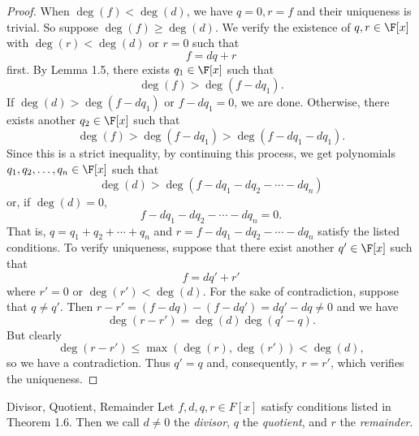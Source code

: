 \documentclass[linearalgebraII]{subfiles}
\begin{document}
    \begin{proof}
        When $\deg(f) < \deg(d)$, we have $q=0, r=f$ and their uniqueness is trivial. So suppose $\deg(f)\geq\deg(d)$. We verify the existence of $q, r\in \F[x]$ with $\deg(r)<\deg(d)$ or $r=0$ such that
        \begin{equation*}
            f = dq+r
        \end{equation*}
        first. By Lemma 1.5, there exists $q_1\in \F[x]$ such that
        \begin{equation*}
            \deg(f) > \deg(f-dq_1).
        \end{equation*}
        If $\deg(d) > \deg(f-dq_1)$ or $f-dq_1 = 0$, we are done. Otherwise, there exists another $q_2\in \F[x]$ such that
        \begin{equation*}
            \deg(f) > \deg(f-dq_1) > \deg(f-dq_1-dq_1).
        \end{equation*}
        Since this is a strict inequality, by continuing this process, we get polynomials $q_1, q_2, \ldots, q_n\in \F[x]$ such that
        \begin{equation*}
            \deg(d) > \deg(f-dq_1-dq_2-\cdots-dq_n)
        \end{equation*}
        or, if $\deg(d) = 0$,
        \begin{equation*}
            f - dq_1 - dq_2 - \cdots - dq_n = 0.
        \end{equation*}
        That is, $q = q_1+q_2+\cdots+q_n$ and $r = f-dq_1-dq_2-\cdots-dq_n$ satisfy the listed conditions. To verify uniqueness, suppose that there exist another $q'\in \F[x]$ such that
        \begin{equation*}
            f = dq'+r'
        \end{equation*}
        where $r' = 0$ or $\deg(r')<\deg(d)$. For the sake of contradiction, suppose that $q\neq q'$. Then $r-r' = (f-dq)-(f-dq') = dq'-dq \neq 0$ and we have
        \begin{equation*}
            \deg(r-r') = \deg(d)\deg(q'-q).
        \end{equation*}
        But clearly
        \begin{equation*}
            \deg(r-r') \leq \max(\deg(r), \deg(r')) < \deg(d),
        \end{equation*}
        so we have a contradiction. Thus $q'=q$ and, consequently, $r=r'$, which verifies the uniqueness.
    \end{proof}

    \begin{definition}{Divisor, Quotient, Remainder}{}
        Let $f, d, q, r\in F[x]$ satisfy conditions listed in Theorem 1.6. Then we call $d\neq 0$ the \emph{divisor}, $q$ the \emph{quotient}, and $r$ the \emph{remainder}.
    \end{definition}
\end{document}
